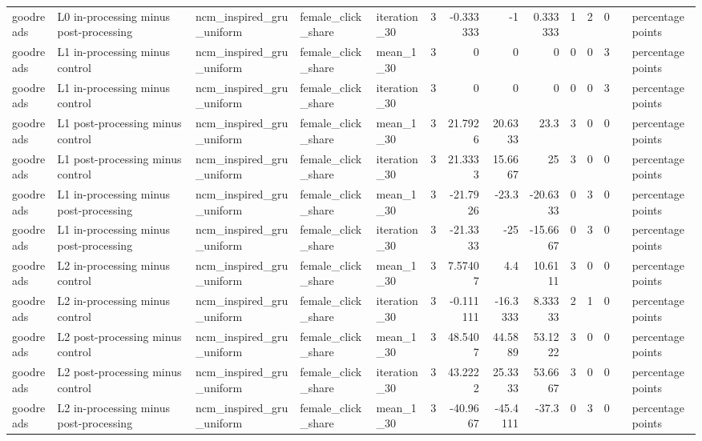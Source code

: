 \begin{table}[htbp!]
\begin{tabular}{lllllrrrrrrrll}
goodreads & L0 in-processing minus post-processing & ncm\_inspired\_gru\_uniform & female\_click\_share & iteration\_30 & 3 & -0.333333 & -1 & 0.333333 & 1 & 2 & 0 &  & percentage points \\
goodreads & L1 in-processing minus control & ncm\_inspired\_gru\_uniform & female\_click\_share & mean\_1\_30 & 3 & 0 & 0 & 0 & 0 & 0 & 3 &  & percentage points \\
goodreads & L1 in-processing minus control & ncm\_inspired\_gru\_uniform & female\_click\_share & iteration\_30 & 3 & 0 & 0 & 0 & 0 & 0 & 3 &  & percentage points \\
goodreads & L1 post-processing minus control & ncm\_inspired\_gru\_uniform & female\_click\_share & mean\_1\_30 & 3 & 21.7926 & 20.6333 & 23.3 & 3 & 0 & 0 &  & percentage points \\
goodreads & L1 post-processing minus control & ncm\_inspired\_gru\_uniform & female\_click\_share & iteration\_30 & 3 & 21.3333 & 15.6667 & 25 & 3 & 0 & 0 &  & percentage points \\
goodreads & L1 in-processing minus post-processing & ncm\_inspired\_gru\_uniform & female\_click\_share & mean\_1\_30 & 3 & -21.7926 & -23.3 & -20.6333 & 0 & 3 & 0 &  & percentage points \\
goodreads & L1 in-processing minus post-processing & ncm\_inspired\_gru\_uniform & female\_click\_share & iteration\_30 & 3 & -21.3333 & -25 & -15.6667 & 0 & 3 & 0 &  & percentage points \\
goodreads & L2 in-processing minus control & ncm\_inspired\_gru\_uniform & female\_click\_share & mean\_1\_30 & 3 & 7.57407 & 4.4 & 10.6111 & 3 & 0 & 0 &  & percentage points \\
goodreads & L2 in-processing minus control & ncm\_inspired\_gru\_uniform & female\_click\_share & iteration\_30 & 3 & -0.111111 & -16.3333 & 8.33333 & 2 & 1 & 0 &  & percentage points \\
goodreads & L2 post-processing minus control & ncm\_inspired\_gru\_uniform & female\_click\_share & mean\_1\_30 & 3 & 48.5407 & 44.5889 & 53.1222 & 3 & 0 & 0 &  & percentage points \\
goodreads & L2 post-processing minus control & ncm\_inspired\_gru\_uniform & female\_click\_share & iteration\_30 & 3 & 43.2222 & 25.3333 & 53.6667 & 3 & 0 & 0 &  & percentage points \\
goodreads & L2 in-processing minus post-processing & ncm\_inspired\_gru\_uniform & female\_click\_share & mean\_1\_30 & 3 & -40.9667 & -45.4111 & -37.3 & 0 & 3 & 0 &  & percentage points \\

\end{tabular}
\end{table}
